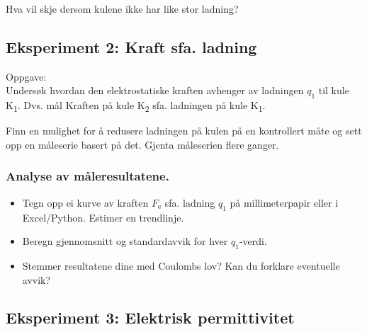 \documentclass[../Elmag-labhefte-2020.tex]{subfiles}
\begin{document}
\begin{itemize}
Hva vil skje dersom kulene ikke har like stor ladning?



\subsection{Eksperiment 2: Kraft sfa. ladning }

Oppgave:\\
{\itsf Undersøk hvordan den elektrostatiske kraften avhenger av ladningen $q_1$ til kule K\textsubscript{1}. Dvs. mål Kraften på kule K\textsubscript{2} sfa. ladningen på kule K\textsubscript{1}.} 

Finn en mulighet for å redusere ladningen på kulen på en kontrollert måte og sett opp en måleserie basert på det. Gjenta måleserien flere ganger.

\subsubsection{Analyse av måleresultatene.}

\vspace{-4mm} 
\begin{itemize}
    \item Tegn opp ei kurve av kraften $F_\text{e}$ sfa. ladning $q_1$ på millimeterpapir eller i Excel/Python. Estimer en trendlinje.
    \item Beregn gjennomsnitt og standardavvik for hver $q_1$-verdi.
    \item Stemmer resultatene dine med Coulombs lov? Kan du forklare eventuelle avvik?
\end{itemize}


\subsection{Eksperiment 3: Elektrisk permittivitet}


\end{itemize}
\end{document}
